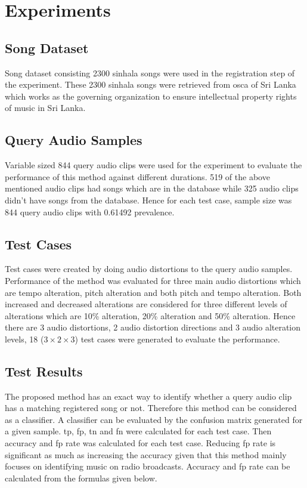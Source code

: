 \section{Experiments}
\label{section:experiments}

\subsection{Song Dataset}
Song dataset consisting 2300 sinhala songs were used in the registration step of the experiment. These 2300 sinhala songs were retrieved from
\gls{osca} of Sri Lanka which works as the governing organization to ensure intellectual property rights of music in Sri Lanka. 

\subsection{Query Audio Samples}
Variable sized 844 query audio clips were used for the experiment to evaluate the performance of this method
against different durations. 519 of the above mentioned audio clips had songs which are in the database while 325 audio clips didn't have songs from 
the database. Hence for each test case, sample size was 844 query audio clips with 0.61492 prevalence.    

\subsection{Test Cases}
Test cases were created by doing audio distortions to the query audio samples. Performance of the method was evaluated for three main audio distortions
which are tempo alteration, pitch alteration and both pitch and tempo alteration. Both increased and decreased alterations are considered for three different
levels of alterations which are 10\% alteration, 20\% alteration and 50\% alteration. Hence there are 3 audio distortions, 2 audio distortion directions and
3 audio alteration levels, 18 (\(3 \times 2 \times 3\)) test cases were generated to evaluate the performance. 

\subsection{Test Results}

The proposed method has an exact way to identify whether a query audio clip has a matching registered song or not. Therefore this method can be considered as
a classifier. A classifier can be evaluated by the confusion matrix generated for a given sample. \gls{tp}, \gls{fp}, \gls{tn} and \gls{fn} were calculated
for each test case. Then accuracy and \gls{fp} rate was calculated for each test case. Reducing \gls{fp} rate is significant as much as increasing the accuracy
given that this method mainly focuses on identifying music on radio broadcasts. Accuracy and \gls{fp} rate can be calculated from the formulas given below. 

